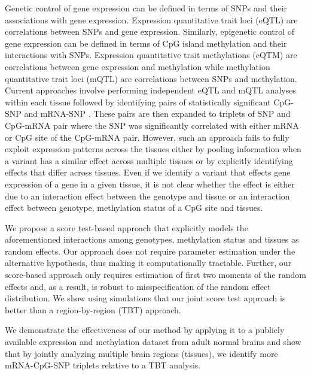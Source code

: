 \documentclass[hidelinks]{article}
\begin{document}
Genetic control of gene expression can be defined in terms of SNPs and their associations with gene expression. Expression quantitative trait loci (eQTL) are correlations between SNPs and gene expression.  Similarly, epigenetic control of gene expression can be defined in terms of CpG island methylation and their interactions with SNPs. Expression quantitative trait methylations (eQTM) are correlations between gene expression and methylation while methylation quantitative trait loci (mQTL) are correlations between SNPs and methylation. Current approaches involve performing independent eQTL and mQTL analyses within each tissue followed by identifying pairs of statistically significant CpG-SNP and mRNA-SNP \cite{gibbs,gen_epigen_tissue}. These pairs are then expanded to  triplets of SNP and CpG-mRNA pair where the SNP was significantly correlated with either mRNA or CpG site of the CpG-mRNA pair. However, such an approach fails to fully exploit expression patterns across the tissues either by pooling information when a variant has a similar effect across multiple tissues or by explicitly identifying effects that differ across tissues. Even if we identify a variant that effects gene expression of a gene in a given tissue, it is not clear whether the effect is either due to an interaction effect between the genotype and tissue or an interaction effect between genotype, methylation status of a CpG site and tissues. 


We propose a score test-based approach that explicitly models the aforementioned interactions among genotypes, methylation status and tissues as random effects. Our approach does not require parameter estimation under the alternative hypothesis, thus making it computationally tractable. Further, our score-based approach only requires estimation of first two moments of the random effects and, as a result, is robust to misspecification of the random effect distribution. We show using simulations that our joint score test approach is better than a region-by-region (TBT) approach. 

We demonstrate the effectiveness of our method by applying it to a publicly available expression and methylation dataset from adult normal brains and show that by jointly analyzing multiple brain regions (tissues), we identify more mRNA-CpG-SNP triplets relative to a TBT analysis.
\end{document}
